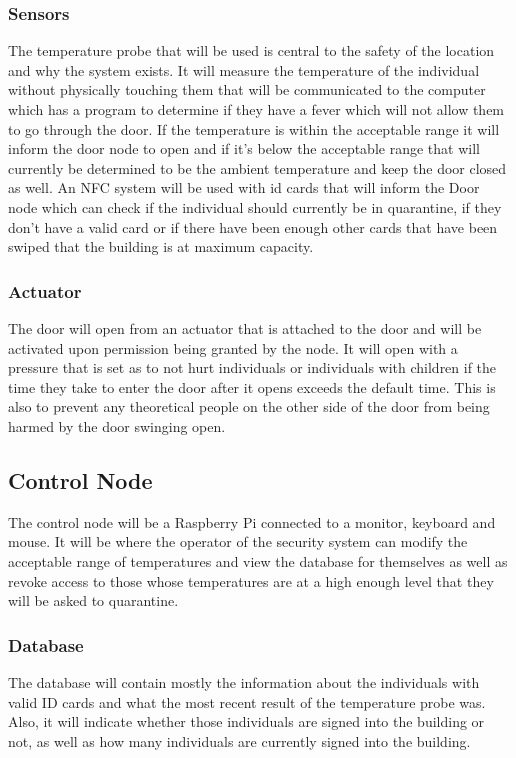 \subsubsection{Sensors}
The temperature probe that will be used is central to the safety of the location and why the system exists. It will measure the temperature of the individual without physically touching them that will be communicated to the computer which has a program to determine if they have a fever which will not allow them to go through the door. If the temperature is within the acceptable range it will inform the door node to open and if it's below the acceptable range that will currently be determined to be the ambient temperature and keep the door closed as well. An NFC system will be used with id cards that will inform the Door node which can check if the individual should currently be in quarantine, if they don't have a valid card or if there have been enough other cards that have been swiped that the building is at maximum capacity.

\subsubsection{Actuator}
The door will open from an actuator that is attached to the door and will be activated upon permission being granted by the node. It will open with a pressure that is set as to not hurt individuals or individuals with children if the time they take to enter the door after it opens exceeds the default time. This is also to prevent any theoretical people on the other side of the door from being harmed by the door swinging open.

\subsection{Control Node}
The control node will be a Raspberry Pi connected to a monitor, keyboard and mouse. It will be where the operator of the security system can modify the acceptable range of temperatures and view the database for themselves as well as revoke access to those whose temperatures are at a high enough level that they will be asked to quarantine.

\subsubsection{Database}
The database will contain mostly the information about the individuals with valid ID cards and what the most recent result of the temperature probe was. Also, it will indicate whether those individuals are signed into the building or not, as well as how many individuals are currently signed into the building.

